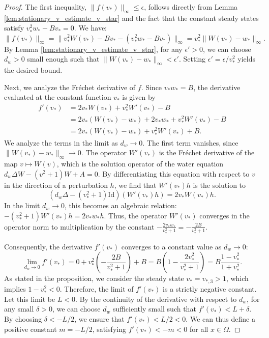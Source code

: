 \documentclass[review,onefignum,onetabnum]{SIAM-styles/siamart171218}
\begin{document}
\begin{proof}
    The first inequality, $\|f(v_*)\|_\infty \leq \epsilon$, follows directly from Lemma \ref{lem:stationary_v_estimate_v_star} and the fact that the constant steady states satisfy $v_*^2w_* - Bv_* = 0$. We have:
    \begin{equation*}
        \|f(v_*)\|_\infty 
        =
        \|v_*^2W(v_*) - Bv_* - (v_*^2w_* - Bv_*)\|_\infty
        =
        v_*^2\|W(v_*) - w_*\|_\infty.
    \end{equation*}
    By Lemma \ref{lem:stationary_v_estimate_v_star}, for any $\epsilon' > 0$, we can choose $d_w > 0$ small enough such that $\|W(v_*) - w_*\|_\infty < \epsilon'$. Setting $\epsilon' = \epsilon / v_*^2$ yields the desired bound.

    Next, we analyze the Fr\'echet derivative of $f$. Since $v_*w_* = B$, the derivative evaluated at the constant function $v_*$ is given by
    \begin{align*}
        f'(v_*) 
        &=
        2v_*W(v_*) + v_*^2W'(v_*) - B \\
        &=
        2v_*(W(v_*) - w_*) + 2v_*w_* + v_*^2W'(v_*) - B \\
        &=
        2v_*(W(v_*) - w_*) + v_*^2W'(v_*) + B.
    \end{align*}
    We analyze the terms in the limit as $d_w \to 0$. The first term vanishes, since $\|W(v_*) - w_*\|_\infty \to 0$. The operator $W'(v_*)$ is the Fr\'echet derivative of the map $v \mapsto W(v)$, which is the solution operator of the water equation $d_w \Delta W - (v^2+1)W + A = 0$. By differentiating this equation with respect to $v$ in the direction of a perturbation $h$, we find that $W'(v_*)h$ is the solution to
    \begin{equation*}
        (d_w \Delta - (v_*^2+1)\mathrm{Id})(W'(v_*)h) = 2v_* W(v_*) h.
    \end{equation*}
    In the limit $d_w \to 0$, this becomes an algebraic relation: $-(v_*^2+1)W'(v_*)h = 2v_* w_* h$. Thus, the operator $W'(v_*)$ converges in the operator norm to multiplication by the constant $-\frac{2v_*w_*}{v_*^2+1} = -\frac{2B}{v_*^2+1}$.
    
    Consequently, the derivative $f'(v_*)$ converges to a constant value as $d_w \to 0$:
    \begin{equation*}
        \lim_{d_w \to 0} f'(v_*) = 0 + v_*^2 \left( -\frac{2B}{v_*^2+1} \right) + B = B \left( 1 - \frac{2v_*^2}{v_*^2+1} \right) = B \frac{1-v_*^2}{1+v_*^2}.
    \end{equation*}
    As stated in the proposition, we consider the steady state $v_* = v_{*,3} > 1$, which implies $1 - v_*^2 < 0$. Therefore, the limit of $f'(v_*)$ is a strictly negative constant. Let this limit be $L < 0$. By the continuity of the derivative with respect to $d_w$, for any small $\delta > 0$, we can choose $d_w$ sufficiently small such that $f'(v_*) < L + \delta$. By choosing $\delta < -L/2$, we ensure that $f'(v_*) < L/2 < 0$. We can thus define a positive constant $m = -L/2$, satisfying $f'(v_*) < -m < 0$ for all $x \in \Omega$.


\end{proof}
\end{document}
